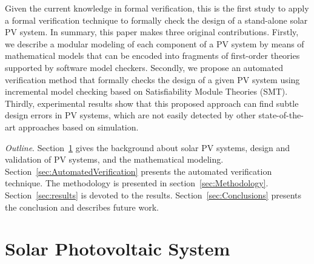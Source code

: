 \documentclass[journal]{IEEEtran}
\begin{document}
Given the current knowledge in formal verification, this is the first study to apply a formal verification technique to formally check the design of a stand-alone solar PV system. In summary, this paper makes three original contributions. Firstly, we describe a modular modeling of each component of a PV system by means of mathematical models that can be encoded into fragments of first-order theories supported by software model checkers. Secondly, we propose an automated verification method that formally checks the design of a given PV system using incremental model checking based on Satisfiability Module Theories (SMT). Thirdly, experimental results show that this proposed approach can find subtle design errors in PV systems, which are not easily detected by other state-of-the-art approaches based on simulation. 

%
 
\textit{Outline}. Section~\ref{sec:SolarPhotovoltaicSystem} gives the background about solar PV systems, design and validation of PV systems, and the mathematical modeling. Section~\ref{sec:AutomatedVerification} presents the automated verification technique. The methodology is presented in section~\ref{sec:Methodology}. Section~\ref{sec:results} is devoted to the results. Section~\ref{sec:Conclusions} presents the conclusion and describes future work.

\section{Solar Photovoltaic System }
\label{sec:SolarPhotovoltaicSystem}

\end{document}
